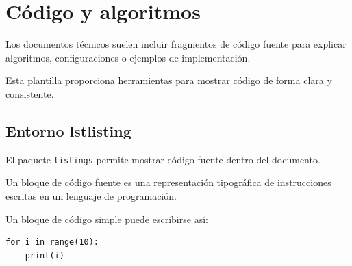 %
%
%
%
%
%
%
%
%


\chapter{Código y algoritmos}

Los documentos técnicos suelen incluir fragmentos de
código fuente para explicar algoritmos, configuraciones
o ejemplos de implementación.

Esta plantilla proporciona herramientas para mostrar
código de forma clara y consistente.




\section{Entorno lstlisting}

El paquete \texttt{listings} permite mostrar código
fuente dentro del documento.

\begin{definitionbox}
Un bloque de código fuente es una representación
tipográfica de instrucciones escritas en un lenguaje
de programación.
\end{definitionbox}



Un bloque de código simple puede escribirse así:

\begin{lstlisting}[caption={Ejemplo básico de código},label={code:basic}]
for i in range(10):
    print(i)
\end{lstlisting}

